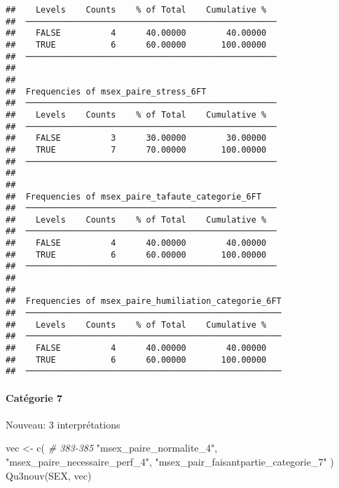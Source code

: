 \documentclass[
]{article}
\newenvironment{Shaded}{\begin{snugshade}}{\end{snugshade}}
\newcommand{\CommentTok}[1]{\textcolor[rgb]{0.56,0.35,0.01}{\textit{#1}}}
\newcommand{\FunctionTok}[1]{\textcolor[rgb]{0.00,0.00,0.00}{#1}}
\newcommand{\NormalTok}[1]{#1}
\newcommand{\OtherTok}[1]{\textcolor[rgb]{0.56,0.35,0.01}{#1}}
\newcommand{\StringTok}[1]{\textcolor[rgb]{0.31,0.60,0.02}{#1}}
\begin{document}
\begin{verbatim}
##    Levels    Counts    % of Total    Cumulative %   
##  ────────────────────────────────────────────────── 
##    FALSE          4      40.00000        40.00000   
##    TRUE           6      60.00000       100.00000   
##  ────────────────────────────────────────────────── 
## 
## 
##  Frequencies of msex_paire_stress_6FT               
##  ────────────────────────────────────────────────── 
##    Levels    Counts    % of Total    Cumulative %   
##  ────────────────────────────────────────────────── 
##    FALSE          3      30.00000        30.00000   
##    TRUE           7      70.00000       100.00000   
##  ────────────────────────────────────────────────── 
## 
## 
##  Frequencies of msex_paire_tafaute_categorie_6FT    
##  ────────────────────────────────────────────────── 
##    Levels    Counts    % of Total    Cumulative %   
##  ────────────────────────────────────────────────── 
##    FALSE          4      40.00000        40.00000   
##    TRUE           6      60.00000       100.00000   
##  ────────────────────────────────────────────────── 
## 
## 
##  Frequencies of msex_paire_humiliation_categorie_6FT 
##  ─────────────────────────────────────────────────── 
##    Levels    Counts    % of Total    Cumulative %   
##  ─────────────────────────────────────────────────── 
##    FALSE          4      40.00000        40.00000   
##    TRUE           6      60.00000       100.00000   
##  ───────────────────────────────────────────────────
\end{verbatim}

\hypertarget{catuxe9gorie-7}{%
\paragraph{Catégorie 7}\label{catuxe9gorie-7}}

Nouveau: 3 interprétations

\begin{Shaded}
\begin{Highlighting}[]
\NormalTok{vec }\OtherTok{\textless{}{-}} \FunctionTok{c}\NormalTok{(  }\CommentTok{\# 383{-}385}
  \StringTok{"msex\_paire\_normalite\_4"}\NormalTok{,}
  \StringTok{"msex\_paire\_necessaire\_perf\_4"}\NormalTok{,}
  \StringTok{"msex\_pair\_faisantpartie\_categorie\_7"}
\NormalTok{)}
\FunctionTok{Qu3nouv}\NormalTok{(SEX, vec)}
\end{Highlighting}
\end{Shaded}
\end{document}
